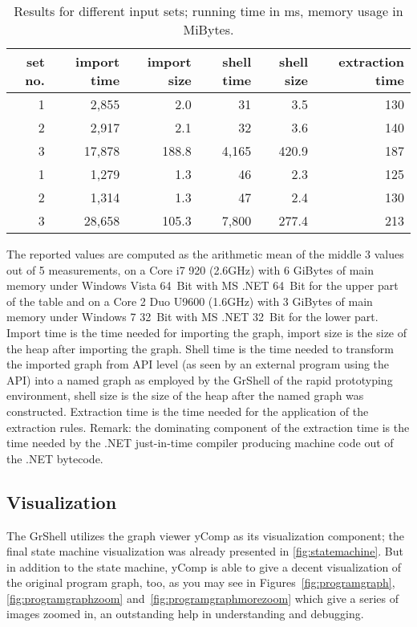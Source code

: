 \documentclass[copyright]{eptcs}
\begin{document}
\begin{table}[h]
\centering
\label{tab:ne}
\begin{tabular}{r||r|r|r|r|r}
	set no. & import time & import size & shell time & shell size & extraction time \\ \hline
       1 &      2,855 &           2.0 &           31 &     3.5 &          130\\
       2 &      2,917 &           2.1 &           32 &     3.6 &          140\\
       3 &     17,878 &         188.8 &        4,165 &   420.9 &          187\\ \hline
       1 &      1,279 &           1.3 &           46 &     2.3 &          125\\
       2 &      1,314 &           1.3 &           47 &     2.4 &          130\\
       3 &     28,658 &         105.3 &        7,800 &   277.4 &          213\\
\end{tabular}
\caption{Results for different input sets; running time in ms, memory usage in MiBytes.}
\end{table}

\noindent The reported values are computed as the arithmetic mean of the middle 3 values out of 5 measurements, on a Core i7 920 (2.6GHz) with 6 GiBytes of main memory under Windows Vista 64~Bit with MS .NET 64~Bit for the upper part of the table and on a Core 2 Duo U9600 (1.6GHz) with 3 GiBytes of main memory under Windows 7 32~Bit with MS .NET 32~Bit for the lower part.
Import time is the time needed for importing the graph, import size is the size of the heap after importing the graph.
Shell time is the time needed to transform the imported graph from API level (as seen by an external program using the API) into a named graph as employed by the GrShell of the rapid prototyping environment, shell size is the size of the heap after the named graph was constructed.
Extraction time is the time needed for the application of the extraction rules.
Remark: the dominating component of the extraction time is the time needed by the .NET just-in-time compiler producing machine code out of the .NET bytecode.


\subsection{Visualization}
The GrShell utilizes the graph viewer yComp as its visualization component; the final state machine visualization was already presented in \autoref{fig:statemachine}.
But in addition to the state machine, yComp is able to give a decent visualization of the original program graph, too, as you may see in Figures~\ref{fig:programgraph}, \ref{fig:programgraphzoom} and~\ref{fig:programgraphmorezoom} which give a series of images zoomed in, an outstanding help in understanding and debugging.
\end{document}
